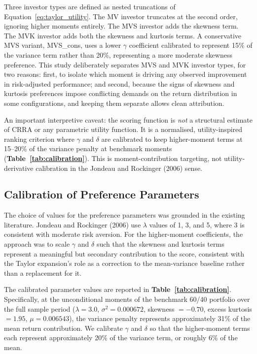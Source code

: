 \documentclass[12pt, a4paper]{article}
\begin{document}
Three investor types are defined as nested truncations of Equation~\eqref{eq:taylor_utility}.
The MV investor truncates at the second order, ignoring higher moments entirely. The MVS
investor adds the skewness term. The MVK investor adds both the skewness and kurtosis terms.
A conservative MVS variant, MVS\_cons, uses a lower $\gamma$ coefficient calibrated to
represent 15\% of the variance term rather than 20\%, representing a more moderate skewness
preference. This study deliberately separates MVS and MVK investor types, for two reasons:
first, to isolate which moment is driving any observed improvement in risk-adjusted
performance; and second, because the signs of skewness and kurtosis preferences impose
conflicting demands on the return distribution in some configurations, and keeping them
separate allows clean attribution.

An important interpretive caveat: the scoring function is \textit{not} a structural
estimate of CRRA or any parametric utility function. It is a normalised,
utility-inspired ranking criterion where $\gamma$ and $\delta$ are calibrated to keep
higher-moment terms at 15--20\% of the variance penalty at benchmark moments
(\textbf{Table~\ref{tab:calibration}}). This is moment-contribution targeting, not
utility-derivative calibration in the Jondeau and Rockinger (2006) sense.

\subsection{Calibration of Preference Parameters}

The choice of values for the preference parameters was grounded in the existing literature.
Jondeau and Rockinger (2006) use $\lambda$ values of 1, 3, and 5, where 3 is consistent
with moderate risk aversion. For the higher-moment coefficients, the approach was to scale
$\gamma$ and $\delta$ such that the skewness and kurtosis terms represent a meaningful but
secondary contribution to the score, consistent with the Taylor expansion's role as a
correction to the mean-variance baseline rather than a replacement for it.

The calibrated parameter values are reported in \textbf{Table~\ref{tab:calibration}}. Specifically, at the unconditional moments of the benchmark 60/40 portfolio over the full
sample period ($\lambda=3.0$, $\sigma^2=0.000672$, skewness $= -0.70$, excess kurtosis $=
1.95$, $\mu = 0.006543$), the variance penalty represents approximately 31\% of the mean
return contribution. We calibrate $\gamma$ and $\delta$ so that the higher-moment terms each
represent approximately 20\% of the variance term, or roughly 6\% of the mean.
\end{document}
